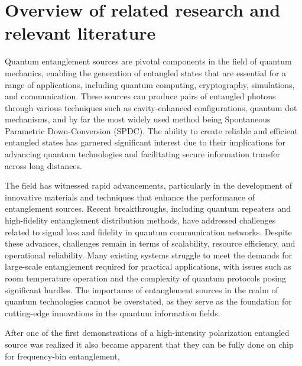 \documentclass{article}
\theoremstyle{mytheoremstyle}
\theoremstyle{mytheoremstyle}
\theoremstyle{myproblemstyle}
\begin{document}
\section{Overview of related research and relevant literature}
Quantum entanglement sources are pivotal components in the field of quantum mechanics, enabling the generation of entangled states
that are essential for a range of applications, including quantum computing, cryptography, simulations, and communication.
These sources can produce pairs of entangled photons through various techniques such as cavity-enhanced configurations,
quantum dot mechanisms, and by far the most widely used method being Spontaneous Parametric Down-Conversion (SPDC).
The ability to create reliable and efficient entangled states has garnered significant interest due to their
implications for advancing quantum technologies and facilitating secure information transfer across long distances.
\par The field has witnessed rapid advancements, particularly in the development of innovative materials and techniques that enhance the
performance of entanglement sources. Recent breakthroughs, including quantum repeaters and high-fidelity entanglement distribution methods,
have addressed challenges related to signal loss and fidelity in quantum communication networks.
Despite these advances, challenges remain in terms of scalability, resource efficiency, and operational reliability.
Many existing systems struggle to meet the demands for large-scale entanglement required for practical applications,
with issues such as room temperature operation and the complexity of quantum protocols posing significant hurdles.
The importance of entanglement sources in the realm of quantum technologies cannot be overstated,
as they serve as the foundation for cutting-edge innovations in the quantum information fields.
\par After one of the first \cite{Kwiat_1995} demonstrations of a high-intensity polarization entangled source was realized it also
became apparent that they can be fully done on chip \cite{S_G_S_C_F_B_L_G_B_2022} for frequency-bin entanglement,
\end{document}
